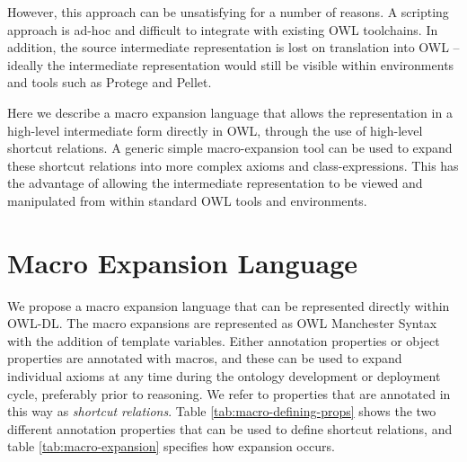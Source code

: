 \documentclass{llncs}
\begin{document}
However, this approach can be unsatisfying for a number of reasons. A
scripting approach is ad-hoc and difficult to integrate with existing
OWL toolchains. In addition, the source intermediate representation is
lost on translation into OWL -- ideally the intermediate representation
would still be visible within environments and tools such as
Protege and Pellet.



Here we describe a macro expansion language that allows the
representation in a high-level intermediate form directly in OWL,
through the use of high-level shortcut relations. A generic simple
macro-expansion tool can be used to expand these shortcut relations
into more complex axioms and class-expressions. This has the advantage
of allowing the intermediate representation to be viewed and
manipulated from within standard OWL tools and environments.




\section{Macro Expansion Language}

We propose a macro expansion language that can be represented directly
within OWL-DL. The macro expansions are represented as OWL Manchester
Syntax\cite{Horridge2006} with the addition of template
variables. Either annotation properties or object properties are
annotated with macros, and these can be used to expand individual
axioms at any time during the ontology development or deployment
cycle, preferably prior to reasoning. We refer to properties that are
annotated in this way as \emph{shortcut relations}.  Table
\ref{tab:macro-defining-props} shows the two different annotation
properties that can be used to define shortcut relations, and table
\ref{tab:macro-expansion} specifies how expansion occurs.
\end{document}
